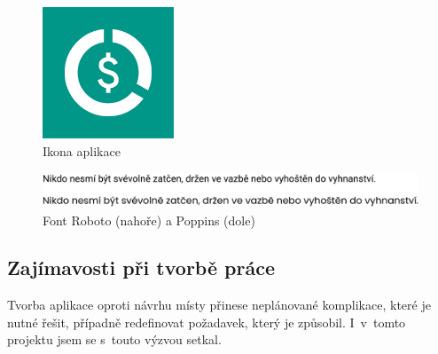\documentclass[
  biblatex,
  figures=true,
  tables=false,
  glossaries,
  index
]{kidiplom}
\begin{document}
\begin{figure}
  \centering
  \includegraphics[width=0.35\textwidth]{images/app-icon.pdf}
  \caption{Ikona aplikace}
  \label{fig:appicon}
\end{figure}

\begin{figure}
  \centering
  \includegraphics[width=\textwidth]{images/font-comparision.pdf}
  \caption{Font Roboto (nahoře) a Poppins (dole)}
  \label{fig:font}
\end{figure}

\subsection{Zajímavosti při tvorbě práce}
Tvorba aplikace oproti návrhu místy přinese neplánované komplikace, které je nutné řešit, případně redefinovat požadavek, který je způsobil. I~v~tomto projektu jsem se s~touto výzvou setkal.
\end{document}
